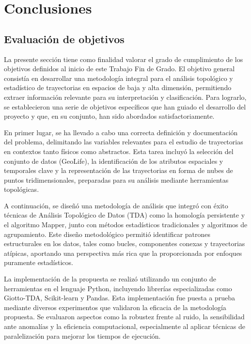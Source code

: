 \chapter{Conclusiones} \label{chp:impacto}


\section{Evaluación de objetivos}

La presente sección tiene como finalidad valorar el grado de cumplimiento de los objetivos definidos al inicio de este Trabajo Fin de Grado. El objetivo general consistía en desarrollar una metodología integral para el análisis topológico y estadístico de trayectorias en espacios de baja y alta dimensión, permitiendo extraer información relevante para su interpretación y clasificación. Para lograrlo, se establecieron una serie de objetivos específicos que han guiado el desarrollo del proyecto y que, en su conjunto, han sido abordados satisfactoriamente.

En primer lugar, se ha llevado a cabo una correcta definición y documentación del problema, delimitando las variables relevantes para el estudio de trayectorias en contextos tanto físicos como abstractos. Esta tarea incluyó la selección del conjunto de datos (GeoLife), la identificación de los atributos espaciales y temporales clave y la representación de las trayectorias en forma de nubes de puntos tridimensionales, preparadas para su análisis mediante herramientas topológicas.

A continuación, se diseñó una metodología de análisis que integró con éxito técnicas de Análisis Topológico de Datos (TDA) como la homología persistente y el algoritmo Mapper, junto con métodos estadísticos tradicionales y algoritmos de agrupamiento. Este diseño metodológico permitió identificar patrones estructurales en los datos, tales como bucles, componentes conexas y trayectorias atípicas, aportando una perspectiva más rica que la proporcionada por enfoques puramente estadísticos.

La implementación de la propuesta se realizó utilizando un conjunto de herramientas en el lenguaje Python, incluyendo librerías especializadas como Giotto-TDA, Scikit-learn y Pandas. Esta implementación fue puesta a prueba mediante diversos experimentos que validaron la eficacia de la metodología propuesta. Se evaluaron aspectos como la robustez frente al ruido, la sensibilidad ante anomalías y la eficiencia computacional, especialmente al aplicar técnicas de paralelización para mejorar los tiempos de ejecución.

